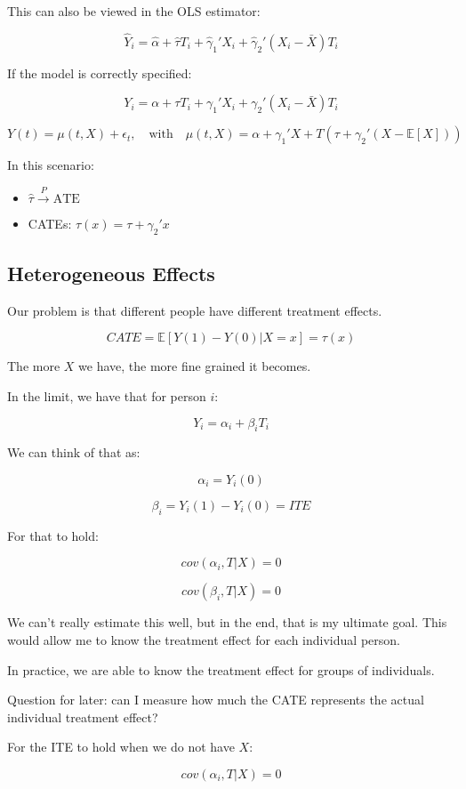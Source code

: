 \documentclass{article}
\begin{document}
This can also be viewed in the OLS estimator:

$$
\hat{Y}_i = \hat{\alpha} + \hat{\tau} T_i + \hat{\gamma}_1' X_i + \hat{\gamma}_2' (X_i - \bar{X}) T_i
$$

If the model is correctly specified:

$$
Y_i = \alpha + \tau T_i + \gamma_1' X_i + \gamma_2' (X_i - \bar{X}) T_i
$$

$$
Y(t) = \mu(t, X) + \epsilon_t, \quad \text{with} \quad \mu(t, X) = \alpha + \gamma_1' X + T (\tau + \gamma_2' (X - \mathbb{E}[X]))
$$

In this scenario:
\begin{itemize}
    \item $\hat{\tau} \xrightarrow{P} \text{ATE}$
    \item CATEs: $\tau(x) = \tau + \gamma_2'x$
\end{itemize}

\subsection{Heterogeneous Effects}
Our problem is that different people have different treatment effects.

$$
CATE = \mathbb{E}[Y(1) - Y(0) | X = x] = \tau(x)
$$

The more $X$ we have, the more fine grained it becomes.

In the limit, we have that for person $i$:

$$
Y_i = \alpha_i + \beta_i T_i
$$

We can think of that as:

$$
\alpha_i = Y_i(0)
$$

$$
\beta_i = Y_i(1) - Y_i(0) = ITE
$$

For that to hold:

$$
cov(\alpha_i, T | X) = 0
$$

$$
cov(\beta_i, T | X) = 0
$$

We can't really estimate this well, but in the end, that is my ultimate goal.
This would allow me to know the treatment effect for each individual person.

In practice, we are able to know the treatment effect for groups of individuals.

Question for later: can I measure how much the CATE represents the actual individual treatment effect?

For the ITE to hold when we do not have $X$:

$$
cov(\alpha_i, T | X) = 0
$$
\end{document}
